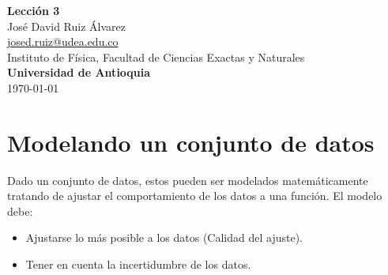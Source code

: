 \documentclass[10.5pt]{article}
\begin{document}
\noindent
\begin{minipage}[b]{0.75\linewidth}
{\LARGE\bf Lecci\'{o}n 3}\\ %
\large{Jos\'{e} David Ruiz \'{A}lvarez} \\
\small{\href{mailto:josed.ruiz@udea.edu.co}{josed.ruiz@udea.edu.co}} \\ %
\normalsize{Instituto de Física, Facultad de Ciencias Exactas y Naturales} \\%
\normalsize{\bf Universidad de Antioquia} \\[8mm]
\today %
\end{minipage}%



\section{Modelando un conjunto de datos}

Dado un conjunto de datos, estos pueden ser modelados matemáticamente tratando de ajustar el comportamiento de los datos a una función. El modelo debe:

\begin{itemize}
\item Ajustarse lo más posible a los datos (Calidad del ajuste).
\item Tener en cuenta la incertidumbre de los datos.
\end{itemize}
\end{document}
